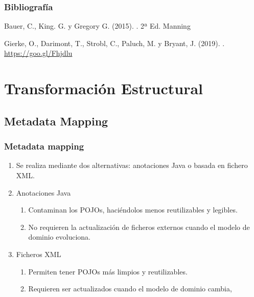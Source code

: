 \documentclass[handout,a4paper,slidestop,xcolor=pst,blue]{beamer}
\begin{document}
\begin{frame}[c]
    \frametitle{Bibliografía}
    \begin{thebibliography}{1}

        Bauer, C., King. G. y Gregory G. (2015).
        . 2ª Ed.
        \newblock Manning

        Gierke, O., Darimont, T., Strobl, C., Paluch, M. y Bryant, J. (2019).
        .
        \url{https://goo.gl/Fhjdlu}
    \end{thebibliography}
\end{frame}

\section{Transformación Estructural}

\subsection{Metadata Mapping}

\begin{frame}[c]
    \frametitle{Metadata mapping}
    \begin{enumerate}[<+->]
         \item<1-> Se realiza mediante dos alternativas: anotaciones Java o basada en fichero XML.
         \item<2-> Anotaciones Java
             \begin{enumerate}
                \item<3-> Contaminan los POJOs, haciéndolos menos reutilizables y legibles.
                \item<4-> No requieren la actualización de ficheros externos cuando el modelo de dominio evoluciona.
             \end{enumerate}
         \item<5-> Ficheros XML
             \begin{enumerate}
                \item<6-> Permiten tener POJOs más limpios y reutilizables.
                \item<7-> Requieren ser actualizados cuando el modelo de dominio cambia,
             \end{enumerate}
    \end{enumerate}
\end{frame}
\end{document}
